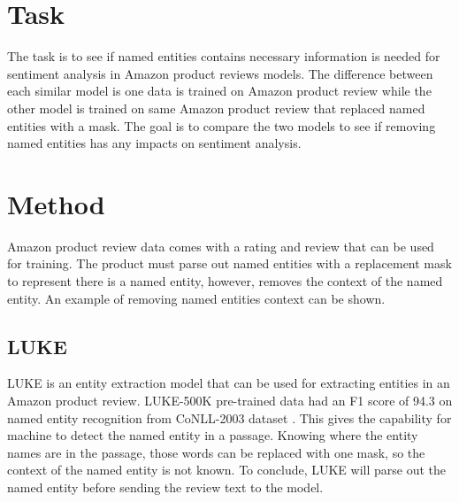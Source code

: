\documentclass[11pt,a4paper]{article}
\begin{document}
\section{Task}

The task is to see if named entities contains necessary information is needed for sentiment analysis in Amazon product reviews models. The difference between each similar model is one data is trained on Amazon product review while the other model is trained on same Amazon product review that replaced named entities with a mask. The goal is to compare the two models to see if removing named entities has any impacts on sentiment analysis.

\section{Method}

Amazon product review data comes with a rating and review that can be used for training. The product must parse out named entities with a replacement mask to represent there is a named entity, however, removes the context of the named entity. An example of removing named entities context can be shown.



\subsection{LUKE}

LUKE is an entity extraction model that can be used for extracting entities in an Amazon product review. LUKE-500K pre-trained data had an F1 score of 94.3 on named entity recognition from CoNLL-2003 dataset \cite{yamada-etal-2020-luke}. This gives the capability for machine to detect the named entity in a passage. Knowing where the entity names are in the passage, those words can be replaced with one mask, so the context of the named entity is not known. To conclude, LUKE will parse out the named entity before sending the review text to the model.
\end{document}
